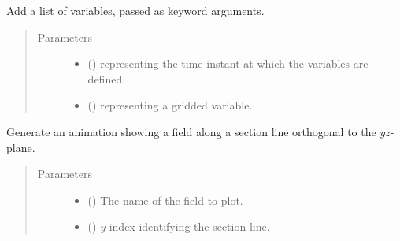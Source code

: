 \documentclass[letterpaper,10pt,english]{sphinxmanual}
\begin{document}
\begin{fulllineitems}
\begin{fulllineitems}
\label{\detokenize{api:storages.grid_data.GridData.add_variables}}
Add a list of variables, passed as keyword arguments.
\begin{quote}\begin{description}
\item[{Parameters}] \leavevmode\begin{itemize}
\item {} 
 () \textendash{}  representing the time instant at which the variables are defined.

\item {} 
 () \textendash{}  representing a gridded variable.

\end{itemize}

\end{description}\end{quote}

\end{fulllineitems}


\begin{fulllineitems}
\label{\detokenize{api:storages.grid_data.GridData.animation_profile_x}}
Generate an animation showing a field along a section line orthogonal to the \(yz\)-plane.
\begin{quote}\begin{description}
\item[{Parameters}] \leavevmode\begin{itemize}
\item {} 
 () \textendash{} The name of the field to plot.

\item {} 
 () \textendash{} \(y\)-index identifying the section line.


\end{itemize}
\end{description}
\end{quote}
\end{fulllineitems}
\end{fulllineitems}
\end{document}
